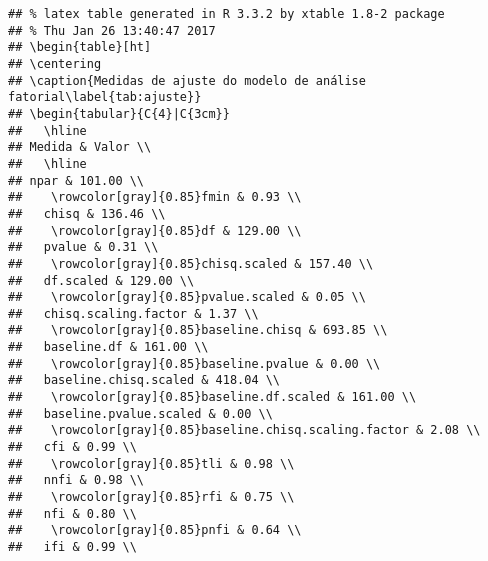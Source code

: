 \begin{knitrout}
\color{fgcolor}\begin{kframe}


{\ttfamily\noindent\color{warningcolor}{\#\# Warning in formatC(x = structure(c(101, 0.934650047651879, 136.458906957174, : class of 'x' was discarded}}\begin{verbatim}
## % latex table generated in R 3.3.2 by xtable 1.8-2 package
## % Thu Jan 26 13:40:47 2017
## \begin{table}[ht]
## \centering
## \caption{Medidas de ajuste do modelo de análise fatorial\label{tab:ajuste}} 
## \begin{tabular}{C{4}|C{3cm}}
##   \hline
## Medida & Valor \\ 
##   \hline
## npar & 101.00 \\ 
##    \rowcolor[gray]{0.85}fmin & 0.93 \\ 
##   chisq & 136.46 \\ 
##    \rowcolor[gray]{0.85}df & 129.00 \\ 
##   pvalue & 0.31 \\ 
##    \rowcolor[gray]{0.85}chisq.scaled & 157.40 \\ 
##   df.scaled & 129.00 \\ 
##    \rowcolor[gray]{0.85}pvalue.scaled & 0.05 \\ 
##   chisq.scaling.factor & 1.37 \\ 
##    \rowcolor[gray]{0.85}baseline.chisq & 693.85 \\ 
##   baseline.df & 161.00 \\ 
##    \rowcolor[gray]{0.85}baseline.pvalue & 0.00 \\ 
##   baseline.chisq.scaled & 418.04 \\ 
##    \rowcolor[gray]{0.85}baseline.df.scaled & 161.00 \\ 
##   baseline.pvalue.scaled & 0.00 \\ 
##    \rowcolor[gray]{0.85}baseline.chisq.scaling.factor & 2.08 \\ 
##   cfi & 0.99 \\ 
##    \rowcolor[gray]{0.85}tli & 0.98 \\ 
##   nnfi & 0.98 \\ 
##    \rowcolor[gray]{0.85}rfi & 0.75 \\ 
##   nfi & 0.80 \\ 
##    \rowcolor[gray]{0.85}pnfi & 0.64 \\ 
##   ifi & 0.99 \\ 

\end{verbatim}
\end{kframe}
\end{knitrout}
